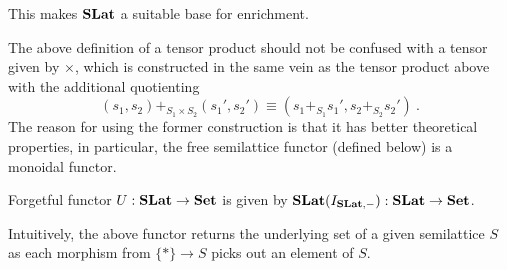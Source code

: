 This makes $\mathbf{SLat}$ a suitable base for enrichment.

\begin{rem}
	The above definition of a tensor product should not be confused with a tensor given by $\times$, which is constructed in the same vein as the tensor product above with the additional quotienting
	\[
		(s_1,s_2) +_{S_1 \times S_2} (s_1',s_2') \equiv (s_1 +_{S_1} s_1', s_2 +_{S_2} s_2')~.
	\]
	The reason for using the former construction is that it has better theoretical properties, in particular, the free semilattice functor (defined below) is a monoidal functor.
\end{rem}

\begin{defi}
	Forgetful functor $U : \mathbf{SLat} \to \mathbf{Set}$ is given by $\mathbf{SLat}(I_{\mathbf{SLat}, -}) : \mathbf{SLat} \to \mathbf{Set}$.
\end{defi}

Intuitively, the above functor returns the underlying set of a given semilattice $S$ as each morphism from $\{*\} \to S$ picks out an element of $S$.

